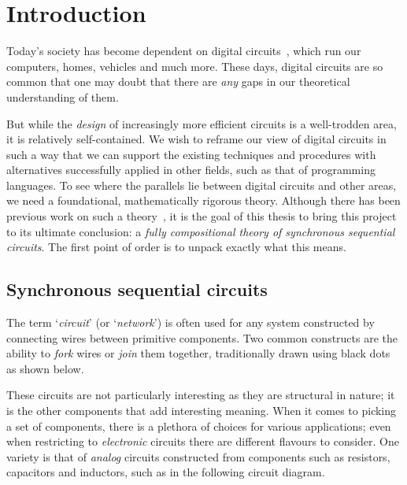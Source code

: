 \chapter{Introduction}

Today's society has become dependent on digital
circuits~\cite{katz2005contemporary}, which run our computers, homes, vehicles
and much more.
These days, digital circuits are so common that one may doubt that there are
\emph{any} gaps in our theoretical understanding of them.

But while the \emph{design} of increasingly more efficient circuits is a
well-trodden area, it is relatively self-contained.
We wish to reframe our view of digital circuits in such a way that we can
support the existing techniques and procedures with alternatives successfully
applied in other fields, such as that of programming languages.
To see where the parallels lie between digital circuits and other areas,
we need a foundational, mathematically rigorous theory.
Although there has been previous work on such a
theory~\cite{lafont2003algebraic,ghica2017diagrammatic,ghica2018structural}, it
is the goal of this thesis to bring this project to its ultimate conclusion:
a \emph{fully compositional theory of synchronous sequential circuits}.
The first point of order is to unpack exactly what this means.

\section{Synchronous sequential circuits}

The term `\emph{circuit}' (or `\emph{network}') is often used for any system
constructed by connecting wires between primitive components.
Two common constructs are the ability to \emph{fork} wires or \emph{join} them together, traditionally drawn
using black dots as shown below.

\begin{center}
\end{center}

These circuits are not particularly interesting as they are structural in
nature; it is the other components that add interesting meaning.
When it comes to picking a set of components, there is a plethora of choices
for various applications; even when restricting to \emph{electronic} circuits
there are different flavours to consider.
One variety is that of \emph{analog} circuits constructed from components such
as resistors, capacitors and inductors, such as in the following circuit
diagram.

